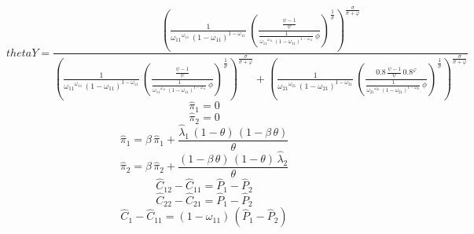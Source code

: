 \begin{dmath*}
thetaY = \frac{\left(\frac{1}{{{\omega_{11}}}^{{{\omega_{11}}}}\, \left(1-{{\omega_{11}}}\right)^{1-{{\omega_{11}}}}}\, \left(\frac{\frac{{{\psi}}-1}{{{\psi}}}}{\frac{1}{{{\omega_{11}}}^{{{\omega_{11}}}}\, \left(1-{{\omega_{11}}}\right)^{1-{{\omega_{11}}}}}\, {{\phi}}}\right)^{\frac{1}{{{\sigma}}}}\right)^{\frac{{{\sigma}}}{{{\sigma}}+{{\varphi}}}}}{\left(\frac{1}{{{\omega_{11}}}^{{{\omega_{11}}}}\, \left(1-{{\omega_{11}}}\right)^{1-{{\omega_{11}}}}}\, \left(\frac{\frac{{{\psi}}-1}{{{\psi}}}}{\frac{1}{{{\omega_{11}}}^{{{\omega_{11}}}}\, \left(1-{{\omega_{11}}}\right)^{1-{{\omega_{11}}}}}\, {{\phi}}}\right)^{\frac{1}{{{\sigma}}}}\right)^{\frac{{{\sigma}}}{{{\sigma}}+{{\varphi}}}}+\left(\frac{1}{{{\omega_{21}}}^{{{\omega_{21}}}}\, \left(1-{{\omega_{21}}}\right)^{1-{{\omega_{21}}}}}\, \left(\frac{0.8\, \frac{{{\psi}}-1}{{{\psi}}}\, 0.8^{{{\varphi}}}}{\frac{1}{{{\omega_{21}}}^{{{\omega_{21}}}}\, \left(1-{{\omega_{21}}}\right)^{1-{{\omega_{21}}}}}\, {{\phi}}}\right)^{\frac{1}{{{\sigma}}}}\right)^{\frac{{{\sigma}}}{{{\sigma}}+{{\varphi}}}}}
\end{dmath*}
\begin{dmath}
{{\hat{\pi}_{1}}}=0
\end{dmath}
\begin{dmath}
{{\hat{\pi}_{2}}}=0
\end{dmath}
\begin{dmath}
{{\hat{\pi}_{1}}}={{\beta}}\, {{\hat{\pi}_{1}}}+\frac{{{\hat{\lambda}_{1}}}\, \left(1-{{\theta}}\right)\, \left(1-{{\beta}}\, {{\theta}}\right)}{{{\theta}}}
\end{dmath}
\begin{dmath}
{{\hat{\pi}_{2}}}={{\beta}}\, {{\hat{\pi}_{2}}}+\frac{\left(1-{{\beta}}\, {{\theta}}\right)\, \left(1-{{\theta}}\right)\, {{\hat{\lambda}_{2}}}}{{{\theta}}}
\end{dmath}
\begin{dmath}
{{\hat{C}_{1 2}}}-{{\hat{C}_{1 1}}}={{\hat{P}_{1}}}-{{\hat{P}_{2}}}
\end{dmath}
\begin{dmath}
{{\hat{C}_{2 2}}}-{{\hat{C}_{2 1}}}={{\hat{P}_{1}}}-{{\hat{P}_{2}}}
\end{dmath}
\begin{dmath}
{{\hat{C}_{1}}}-{{\hat{C}_{1 1}}}=\left(1-{{\omega_{11}}}\right)\, \left({{\hat{P}_{1}}}-{{\hat{P}_{2}}}\right)
\end{dmath}
